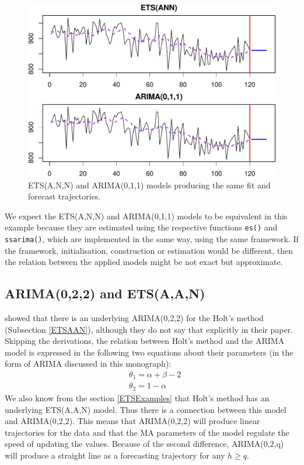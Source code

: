 \documentclass[
]{book}
\theoremstyle{definition}
\theoremstyle{definition}
\theoremstyle{definition}
\theoremstyle{definition}
\theoremstyle{remark}
\begin{document}
\begin{figure}
\centering
\includegraphics{Svetunkov--2022----ADAM_files/figure-latex/ETSARIMAConnection-1.pdf}
\caption{\label{fig:ETSARIMAConnection}ETS(A,N,N) and ARIMA(0,1,1) models producing the same fit and forecast trajectories.}
\end{figure}

We expect the ETS(A,N,N) and ARIMA(0,1,1) models to be equivalent in this example because they are estimated using the respective functions \texttt{es()} and \texttt{ssarima()}, which are implemented in the same way, using the same framework. If the framework, initialisation, construction or estimation would be different, then the relation between the applied models might be not exact but approximate.

\hypertarget{ARIMAETS022}{%
\subsection{ARIMA(0,2,2) and ETS(A,A,N)}\label{ARIMAETS022}}

\citet{Nerlove1964} showed that there is an underlying ARIMA(0,2,2) for the Holt's method (Subsection \ref{ETSAAN}), although they do not say that explicitly in their paper. Skipping the derivations, the relation between Holt's method and the ARIMA model is expressed in the following two equations about their parameters (in the form of ARIMA discussed in this monograph):
\begin{equation*}
  \begin{aligned}
    &\theta_1 = \alpha + \beta -2 \\
    &\theta_2 = 1 -\alpha
  \end{aligned}
\end{equation*}
We also know from the section \ref{ETSExamples} that Holt's method has an underlying ETS(A,A,N) model. Thus there is a connection between this model and ARIMA(0,2,2). This means that ARIMA(0,2,2) will produce linear trajectories for the data and that the MA parameters of the model regulate the speed of updating the values. Because of the second difference, ARIMA(0,2,q) will produce a straight line as a forecasting trajectory for any \(h\geq q\).
\end{document}
